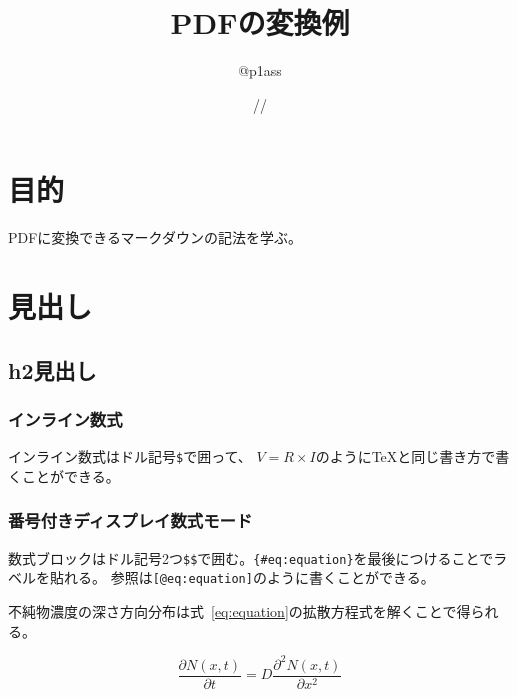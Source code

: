\documentclass[
]{ltjarticle}
\title{PDFの変換例}
\author{@p1ass}
\date{\the\year/\the\month/\the\day}
\begin{document}
\maketitle

\hypertarget{ux76eeux7684}{%
\section{目的}\label{ux76eeux7684}}

PDFに変換できるマークダウンの記法を学ぶ。

\hypertarget{ux898bux51faux3057}{%
\section{見出し}\label{ux898bux51faux3057}}

\hypertarget{h2ux898bux51faux3057}{%
\subsection{h2見出し}\label{h2ux898bux51faux3057}}

\hypertarget{ux30a4ux30f3ux30e9ux30a4ux30f3ux6570ux5f0f}{%
\subsubsection{インライン数式}\label{ux30a4ux30f3ux30e9ux30a4ux30f3ux6570ux5f0f}}

インライン数式はドル記号\texttt{\$}で囲って、
\(V = R \times I\)のようにTeXと同じ書き方で書くことができる。

\hypertarget{ux756aux53f7ux4ed8ux304dux30c7ux30a3ux30b9ux30d7ux30ecux30a4ux6570ux5f0fux30e2ux30fcux30c9}{%
\subsubsection{番号付きディスプレイ数式モード}\label{ux756aux53f7ux4ed8ux304dux30c7ux30a3ux30b9ux30d7ux30ecux30a4ux6570ux5f0fux30e2ux30fcux30c9}}

数式ブロックはドル記号2つ\texttt{\$\$}で囲む。\texttt{\{\#eq:equation\}}を最後につけることでラベルを貼れる。
参照は\texttt{{[}@eq:equation{]}}のように書くことができる。

不純物濃度の深さ方向分布は式~\ref{eq:equation}の拡散方程式を解くことで得られる。

\begin{equation}
\frac{\partial N(x,t)}{\partial t} = D \frac{\partial^2N(x,t)}{\partial x^2}
\label{eq:equation}\end{equation}
\end{document}
